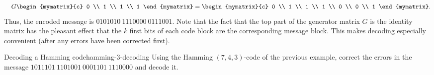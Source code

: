 \begin{solution}
\begin{equation*}
    \quad
    G \begin{mymatrix}{c} 0 \\ 1 \\ 1 \\ 1 \end{mymatrix}
    = \begin{mymatrix}{c} 0 \\ 1 \\ 1 \\ 1 \\ 0 \\ 0 \\ 1 \end{mymatrix}.
  \end{equation*}
  Thus, the encoded message is $0101010~1110000~0111001$. Note that
  the fact that the top part of the generator matrix $G$ is the
  identity matrix has the pleasant effect that the $k$ first bits of
  each code block are the corresponding message block. This makes
  decoding especially convenient (after any errors have been corrected
  first).
\end{solution}

\begin{example}{Decoding a Hamming code}{hamming-3-decoding}
  Using the Hamming $(7,4,3)$-code of the previous example, correct
  the errors in the message $1011101~1101001~0001101~1110000$ and
  decode it.
\end{example}

